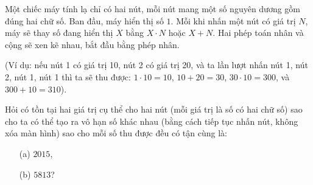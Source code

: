 \ifshowproblem
\begin{problem}\label{example:CPS-2015-P4}
    Một chiếc máy tính lạ chỉ có hai nút, mỗi nút mang một số nguyên dương gồm đúng hai chữ số. Ban đầu, máy hiển thị số \(1\).  
    Mỗi khi nhấn một nút có giá trị \(N\), máy sẽ thay số đang hiển thị \(X\) bằng \(X \cdot N\) hoặc \(X + N\).  
    Hai phép toán nhân và cộng sẽ xen kẽ nhau, bắt đầu bằng phép nhân.
    
    (Ví dụ: nếu nút 1 có giá trị 10, nút 2 có giá trị 20, và ta lần lượt nhấn nút 1, nút 2, nút 1, nút 1 thì ta sẽ thu được:
    \(1 \cdot 10 = 10\), \(10 + 20 = 30\), \(30 \cdot 10 = 300\), và \(300 + 10 = 310\)).
    
    Hỏi có tồn tại hai giá trị cụ thể cho hai nút (mỗi giá trị là số có hai chữ số) sao cho ta có thể tạo ra vô hạn số khác nhau  
    (bằng cách tiếp tục nhấn nút, không xóa màn hình) sao cho mỗi số thu được đều có tận cùng là:
    \begin{itemize}
        \item[(a)] \(2015\),
        \item[(b)] \(5813\)?
    \end{itemize} 
\end{problem}
\fi

\fi